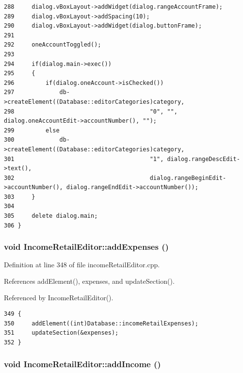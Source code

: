 \begin{verbatim}
288     dialog.vBoxLayout->addWidget(dialog.rangeAccountFrame);
289     dialog.vBoxLayout->addSpacing(10);
290     dialog.vBoxLayout->addWidget(dialog.buttonFrame);
291     
292     oneAccountToggled();
293     
294     if(dialog.main->exec())
295     {
296         if(dialog.oneAccount->isChecked())
297             db->createElement((Database::editorCategories)category,
298                                       "0", "", dialog.oneAccountEdit->accountNumber(), "");
299         else
300             db->createElement((Database::editorCategories)category,
301                                       "1", dialog.rangeDescEdit->text(),
302                                       dialog.rangeBeginEdit->accountNumber(), dialog.rangeEndEdit->accountNumber());
303     }
304     
305     delete dialog.main;
306 }
\end{verbatim}\normalsize 


\hypertarget{classIncomeRetailEditor_k4}{
\subsubsection[addExpenses]{\setlength{\rightskip}{0pt plus 5cm}void Income\-Retail\-Editor::add\-Expenses ()}}
\label{classIncomeRetailEditor_k4}


Definition at line 348 of file income\-Retail\-Editor.cpp.

References add\-Element(), expenses, and update\-Section().

Referenced by Income\-Retail\-Editor().

\footnotesize\begin{verbatim}349 {
350     addElement((int)Database::incomeRetailExpenses);
351     updateSection(&expenses);
352 }
\end{verbatim}\normalsize 


\hypertarget{classIncomeRetailEditor_k2}{
\subsubsection[addIncome]{\setlength{\rightskip}{0pt plus 5cm}void Income\-Retail\-Editor::add\-Income ()}}
\label{classIncomeRetailEditor_k2}


